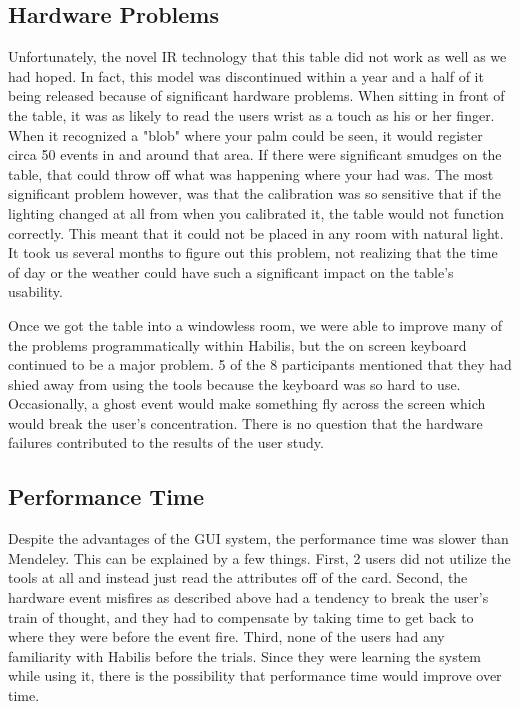 \documentclass{article}
\begin{document}
\subsection*{Hardware Problems}
Unfortunately, the novel IR technology that this table did not work as well as we had hoped.  In fact, this model was discontinued within a year and a half of it being released because of significant hardware problems.  When sitting in front of the table, it was as likely to read the users wrist as a touch as his or her finger.  When it recognized a "blob" where your palm could be seen, it would register circa 50 events in and around that area.  If there were significant smudges on the table, that could throw off what was happening where your had was.  The most significant problem however, was that the calibration was so sensitive that if the lighting changed at all from when you calibrated it, the table would not function correctly.  This meant that it could not be placed in any room with natural light.  It took us several months to figure out this problem, not realizing that the time of day or the weather could have such a significant impact on the table's usability.  

Once we got the table into a windowless room, we were able to improve many of the problems programmatically within Habilis, but the on screen keyboard continued to be a major problem.  5 of the 8 participants mentioned that they had shied away from using the tools because the keyboard was so hard to use.  Occasionally, a ghost event would make something fly across the screen which would break the user's concentration.  There is no question that the hardware failures contributed to the results of the user study.      
\subsection*{Performance Time}
Despite the advantages of the GUI system, the performance time was slower than Mendeley.  This can be explained by a few things.  First, 2 users did not utilize the tools at all and instead just read the attributes off of the card.  Second, the hardware event misfires as described above had a tendency to break the user's train of thought, and they had to compensate by taking time to get back to where they were before the event fire.  Third, none of the users had any familiarity with Habilis before the trials.  Since they were learning the system while using it, there is the possibility that performance time would improve over time. 
\end{document}
